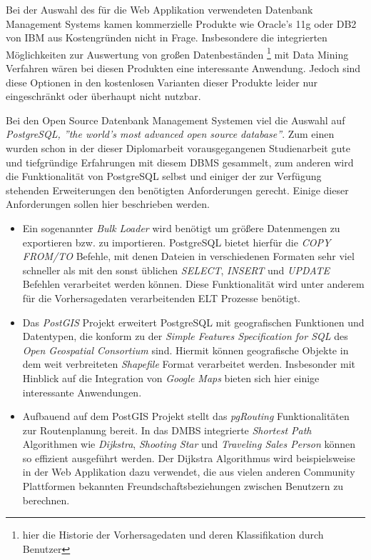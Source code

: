 Bei der Auswahl des für die Web Applikation verwendeten Datenbank
Management Systems kamen kommerzielle Produkte wie Oracle's 11g oder
DB2 von IBM aus Kostengründen nicht in Frage. Insbesondere die
integrierten Möglichkeiten zur Auswertung von großen Datenbeständen
\footnote{hier die Historie der Vorhersagedaten und deren
  Klassifikation durch Benutzer} mit Data Mining Verfahren wären bei
diesen Produkten eine interessante Anwendung. Jedoch sind diese
Optionen in den kostenlosen Varianten dieser Produkte leider nur
eingeschränkt oder überhaupt nicht nutzbar.

Bei den Open Source Datenbank Management Systemen viel die Auswahl auf
\textit{PostgreSQL, ''the world's most advanced open source
  database''}. Zum einen wurden schon in der dieser Diplomarbeit
vorausgegangenen Studienarbeit gute und tiefgründige Erfahrungen mit
diesem DBMS gesammelt, zum anderen wird die Funktionalität von
PostgreSQL selbst und einiger der zur Verfügung stehenden
Erweiterungen den benötigten Anforderungen gerecht. Einige dieser
Anforderungen sollen hier beschrieben werden.

\begin{itemize}
\item Ein sogenannter \textit{Bulk Loader} wird benötigt um größere
  Datenmengen zu exportieren bzw. zu importieren. PostgreSQL bietet
  hierfür die \textit{COPY FROM/TO} Befehle, mit denen Dateien in
  verschiedenen Formaten sehr viel schneller als mit den sonst
  üblichen \textit{SELECT}, \textit{INSERT} und \textit{UPDATE}
  Befehlen verarbeitet werden können. Diese Funktionalität wird unter
  anderem für die Vorhersagedaten verarbeitenden ELT Prozesse
  benötigt.

\item Das \textit{PostGIS} Projekt erweitert PostgreSQL mit
  geografischen Funktionen und Datentypen, die konform zu der
  \textit{Simple Features Specification for SQL} des \textit{Open
    Geospatial Consortium} sind. Hiermit können geografische Objekte
  in dem weit verbreiteten \textit{Shapefile} Format verarbeitet
  werden. Insbesonder mit Hinblick auf die Integration von
  \textit{Google Maps} bieten sich hier einige interessante
  Anwendungen.

\item Aufbauend auf dem PostGIS Projekt stellt das \textit{pgRouting}
  Funktionalitäten zur Routenplanung bereit. In das DMBS integrierte
  \textit{Shortest Path} Algorithmen wie \textit{Dijkstra},
  \textit{Shooting Star} und \textit{Traveling Sales Person} können so
  effizient ausgeführt werden. Der Dijkstra Algorithmus wird
  beispielsweise in der Web Applikation dazu verwendet, die aus vielen
  anderen Community Plattformen bekannten Freundschaftsbeziehungen
  zwischen Benutzern zu berechnen.

\end{itemize}

